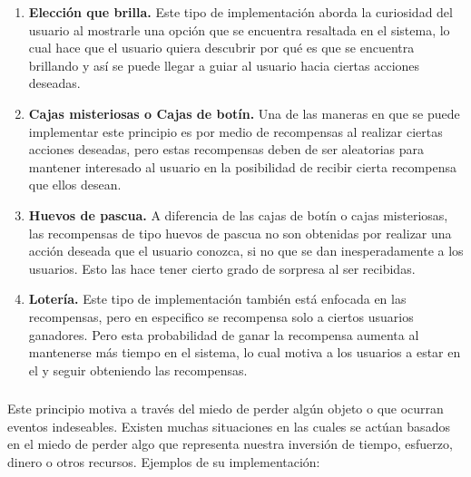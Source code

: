        \begin{enumerate}
           \item \textbf{Elección que brilla.}\cite[p. 297]{libro2} Este tipo de implementación aborda la curiosidad del usuario al mostrarle una opción que se encuentra resaltada en el sistema, lo cual hace que el usuario quiera descubrir por qué es que se encuentra brillando y así se puede llegar a guiar al usuario hacia ciertas acciones deseadas.
           
           \item \textbf{Cajas misteriosas o Cajas de botín.}\cite[p. 299]{libro2} Una de las maneras en que se puede implementar este principio es por medio de recompensas al realizar ciertas acciones deseadas, pero estas recompensas deben de ser aleatorias para mantener interesado al usuario en la posibilidad de recibir cierta recompensa que ellos desean.
           
           \item \textbf{Huevos de pascua.}\cite[p. 301]{libro2} A diferencia de las cajas de botín o cajas misteriosas, las recompensas de tipo huevos de pascua no son obtenidas por realizar una acción deseada que el usuario conozca, si no que se dan inesperadamente a los usuarios. Esto las hace tener cierto grado de sorpresa al ser recibidas.
           
           \item \textbf{Lotería.}\cite[p. 305]{libro2} Este tipo de implementación también está enfocada en las recompensas, pero en especifico se recompensa solo a ciertos usuarios ganadores. Pero esta probabilidad de ganar la recompensa aumenta al mantenerse más tiempo en el sistema, lo cual motiva a los usuarios a estar en el y seguir obteniendo las recompensas.
       \end{enumerate}
    \subsubsection{\principioVIII}
    \label{subsec:principioVIII}
        Este principio motiva a través del miedo de perder algún objeto o que ocurran eventos indeseables. Existen muchas situaciones en las cuales se actúan basados en el miedo de perder algo que representa nuestra inversión de tiempo, esfuerzo, dinero o otros recursos\cite{libro3}. Ejemplos de su implementación:
        
